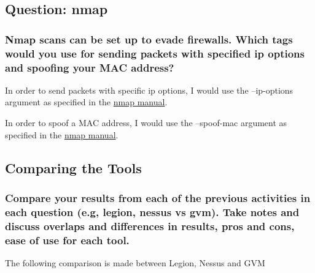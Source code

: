 \subsection{Question: nmap}
\subsubsection{Nmap scans can be set up to evade firewalls. Which tags would you use for sending packets with specified ip options and spoofing your MAC address?}
In order to send packets with specific ip options, I would use the --ip-options argument as specified in the \href{https://nmap.org/book/man-bypass-firewalls-ids.html}{nmap manual}.

In order to spoof a MAC address, I would use the --spoof-mac argument as specified in the \href{https://nmap.org/book/man-bypass-firewalls-ids.html}{nmap manual}.

\subsection{Comparing the Tools}
\subsubsection{Compare your results from each of the previous activities in each question (e.g, legion, nessus vs gvm). Take notes and discuss overlaps and differences in results, pros and cons, ease of use for each tool.}
The following comparison is made between Legion, Nessus and GVM

